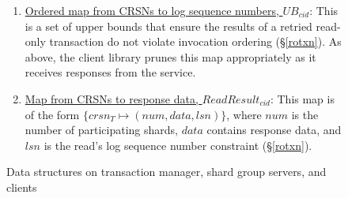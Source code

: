 \documentclass{article}
\begin{document}
\begin{figure}[H]
\begin{tcolorbox}[title= On \textbf{client} $cid$, enhanced,width=1.05\textwidth, left skip=-0.5cm, colback=black!4!white]
\begin{enumerate}[itemsep=1pt]
  \item \underline{Ordered map from CRSNs to log sequence numbers, $UB_{cid}$}: This is a set of upper bounds that ensure the results of a retried read-only transaction do not violate invocation ordering (\S \ref{rotxn}). As above, the client library prunes this map appropriately as it receives responses from the service.
  \item \underline{Map from CRSNs to response data, $ReadResult_{cid}$}: This map is of the form $\{crsn_T \mapsto (num, data, lsn)\}$, where $num$ is the number of participating shards, $data$ contains response data, and $lsn$ is the read's log sequence number constraint (\S \ref{rotxn}). 
  \end{enumerate}
\end{tcolorbox}
\caption{Data structures on transaction manager, shard group servers, and clients}
 \label{state}
\end{figure}



\newpage
\end{document}

